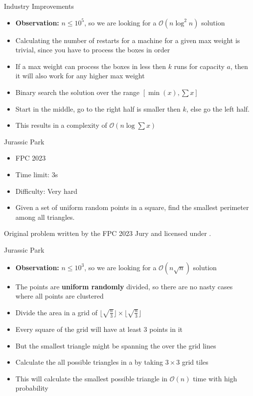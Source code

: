 \documentclass[11pt,pdf, aspectratio=169]{beamer}
\begin{document}
  \begin{frame}{Industry Improvements}
    \begin{itemize}
      \item<1-> \textbf{Observation:} $n \leq  10^5$, so we are looking for a $\mathcal{O}(n \log^2 n)$ solution
      \item<2-> Calculating the number of restarts for a machine for a given max weight is trivial, since you have to process the boxes in order
      \item<3-> If a max weight can process the boxes in less then $k$ runs for capacity $a$, then it will also work for any higher max weight
      \item<4-> Binary search the solution over the range $[\min(x), \sum x]$
      \item<4-> Start in the middle, go to the right half is smaller then $k$, else go the left half.
      \item<5-> This results in a complexity of $\mathcal{O}(n \log \sum x)$
    \end{itemize}
  \end{frame}
  \begin{frame}{ Jurassic Park}
    \begin{itemize}
      \item FPC 2023
      \item Time limit: 3s
      \item Difficulty: Very hard
      \item Given a set of uniform random points in a square, find the smallest perimeter among all triangles.

    \end{itemize}
    Original problem written by the FPC 2023 Jury and licensed under \doclicenseLongNameRef.

    \doclicenseImage

  \end{frame}
  \begin{frame}{Jurassic Park}
    \begin{itemize}
      \item<1-> \textbf{Observation:} $n \leq  10^3$, so we are looking for a $\mathcal{O}(n \sqrt {n})$ solution
      \item<2-> The points are \textbf{uniform randomly} divided, so there are no nasty cases where all points are clustered
      \item<3-> Divide the area in a grid of $\lfloor\sqrt {\frac{n}{3}} \rfloor \times \lfloor\sqrt {\frac{n}{3}} \rfloor$
      \item<4-> Every square of the grid will have at least 3 points in it
      \item<4-> But the smallest triangle might be spanning the over the grid lines
      \item<5-> Calculate the all possible triangles in a by taking $3\times 3$ grid tiles
      \item<6-> This will calculate the smallest possible triangle in $\mathcal{O}(n)$ time with high probability
    \end{itemize}
  \end{frame}
\end{document}
